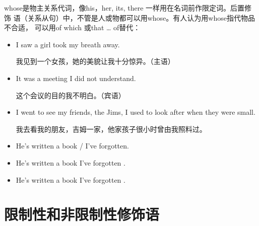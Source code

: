 whose是物主关系代词，像his，her, its, there 一样用在名词前作限定词。后置修饰
语（关系从句）中，不管是人或物都可以用whose。有人认为用whose指代物品不合适，
可以用of which 或that \ldots{} of替代：
\begin{itemize}
\item I saw a girl  took my breath away.

  我见到一个女孩，她的美貌让我十分惊异。（主语）

\item It was a meeting  I did not understand.

  这个会议的目的我不明白。（宾语）


\item I went to see my friends, the Jims,  I used to
  look after when they were small.

  我去看我的朋友，吉姆一家，他家孩子很小时曾由我照料过。


\item He's written a book / I've forgotten.
\item He's written a book  I've forgotten .
\item He's written a book  I've forgotten .
\end{itemize}


\section{限制性和非限制性修饰语}
\label{sec:infmodifi}

